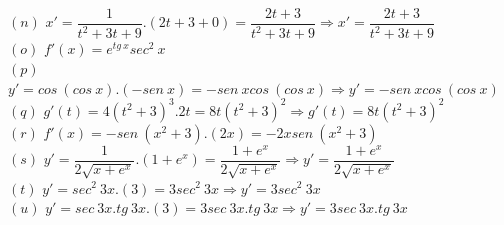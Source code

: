 \documentclass[12pt,openright,twoside,a4paper]{article}
\theoremstyle{definition}
\begin{document}
		$(n)$ $x' = \dfrac{1}{t^{2} + 3t + 9}.(2t + 3 + 0) = \dfrac{2t + 3}{t^{2} + 3t + 9} \Longrightarrow x' = \dfrac{2t + 3}{t^{2} + 3t + 9}$ \\
		
		$(o)$ $f'(x) = e^{tg \ x}sec^{2} \ x$ \\
		
		$(p)$ $y' = cos \ (cos \ x).(-sen \ x) = -sen \ xcos \ (cos \ x) \Longrightarrow y' = -sen \ xcos \ (cos \ x)$ \\
		
		$(q)$ $g'(t) = 4(t^{2} + 3)^{3}.2t = 8t(t^{2} + 3)^{2} \Longrightarrow g'(t) = 8t(t^{2} + 3)^{2}$ \\
		
		$(r)$ $f'(x) = -sen \ (x^{2} + 3).(2x) = -2xsen \ (x^{2} + 3)$ \\
		
		$(s)$ $y' = \dfrac{1}{2\sqrt{x + e^{x}}}.(1 + e^{x}) = \dfrac{1 + e^{x}}{2\sqrt{x + e^{x}}} \Longrightarrow y' = \dfrac{1 + e^{x}}{2\sqrt{x + e^{x}}}$ \\
		
		$(t)$ $y' = sec^{2} \ 3x.(3) = 3sec^{2} \ 3x \Longrightarrow y' = 3sec^{2} \ 3x$ \\
		
		$(u)$ $y' = sec \ 3x.tg \ 3x.(3) = 3sec \ 3x.tg \ 3x \Longrightarrow y' = 3sec \ 3x.tg \ 3x$ \\
		
\end{document}
